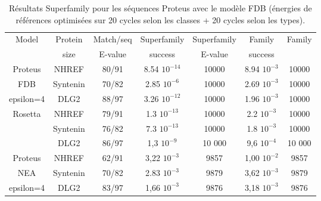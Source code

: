 \begin{table}[h]
  \raggedleft{}
  
  \begin{tabular}{ccccccc}
    
    \toprule
    Model &Protein & Match/seq & Superfamily & Superfamily & Family & Family \\
            & size      & E-value      & success     & E-value & success\\
    \cmidrule{1-7}
    Proteus                   & NHREF     & 80/91  &  8.54 $10^{-14}$  & 10000  & 8.94 $10^{-3}$ & 10000 \\
    FDB                       & Syntenin  & 70/82  &  2.85 $10^{-6}$   & 10000  & 2.69 $10^{-3}$ & 10000 \\
    epsilon=4                 & DLG2      & 88/97  &  3.26 $10^{-12}$  & 10000  & 1.96 $10^{-3}$ & 10000 \\
    \cmidrule{1-7}
    \multirow{3}{*}{Rosetta}  & NHREF     & 79/91  &  1.3 $10^{-13}$ & 10000    & 2.2 $10^{-3}$ & 10000 \\
                              & Syntenin  & 76/82  &  7.3 $10^{-13}$ & 10000    & 1.8 $10^{-3}$ & 10000 \\
                              & DLG2      & 86/97  &  1,3 $10^{-9}$  & 10 000    & 9,6 $10^{-4}$ & 10 000 \\    
    \cmidrule{1-7}
    Proteus                   & NHREF     & 62/91 &   3,22 $10^{-3}$  & 9857    & 1,00 $10^{-2}$ & 9857 \\
    NEA                       & Syntenin  & 70/82 &   2.83 $10^{-3}$  & 9879    & 3,62 $10^{-3}$ & 9879 \\
    epsilon=4                 & DLG2      & 83/97 &   1,66 $10^{-3}$  & 9876    & 3,18 $10^{-3}$ & 9876 \\ 
    \bottomrule        
  \end{tabular}   
  \caption{Résultats Superfamily pour les séquences Proteus avec le modèle FDB (énergies de références optimisées sur 20 cycles selon les classes + 20 cycles selon les types).}   
  \label{tab:superfamily3prot}       
\end{table}


